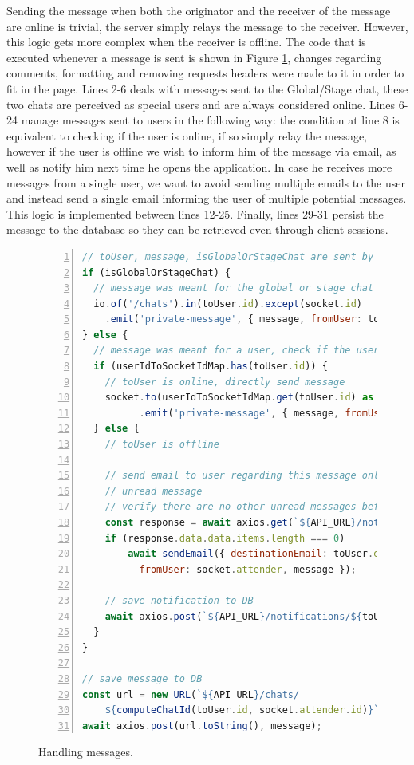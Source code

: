 Sending the message when both the originator and the receiver of the message are online is trivial, the server simply relays the message to the receiver. However, this logic gets more complex when the receiver is offline. The code that is executed whenever a message is sent is shown in Figure \ref{figure:backend-stage-server-messages}, changes regarding comments, formatting and removing requests headers were made to it in order to fit in the page. Lines 2-6 deals with messages sent to the Global/Stage chat, these two chats are perceived as special users and are always considered online. Lines 6-24 manage messages sent to users in the following way: the condition at line 8 is equivalent to checking if the user is online, if so simply relay the message, however if the user is offline we wish to inform him of the message via email, as well as notify him next time he opens the application. In case he receives more messages from a single user, we want to avoid sending multiple emails to the user and instead send a single email informing the user of multiple potential messages. This logic is implemented between lines 12-25. Finally, lines 29-31 persist the message to the database so they can be retrieved even through client sessions.

\begin{figure}[H]
\begin{lstlisting}[numbers=left,basicstyle=\small,language=JavaScript]
// toUser, message, isGlobalOrStageChat are sent by the client
if (isGlobalOrStageChat) {
  // message was meant for the global or stage chat
  io.of('/chats').in(toUser.id).except(socket.id)
    .emit('private-message', { message, fromUser: toUser });
} else {
  // message was meant for a user, check if the user is online
  if (userIdToSocketIdMap.has(toUser.id)) {
    // toUser is online, directly send message
    socket.to(userIdToSocketIdMap.get(toUser.id) as string)
          .emit('private-message', { message, fromUser: socket.attender });
  } else {
    // toUser is offline
    
    // send email to user regarding this message only if this is the first
    // unread message
    // verify there are no other unread messages before sending email
    const response = await axios.get(`${API_URL}/notifications/${toUser.id}`);
    if (response.data.data.items.length === 0)
        await sendEmail({ destinationEmail: toUser.email,
          fromUser: socket.attender, message });

    // save notification to DB
    await axios.post(`${API_URL}/notifications/${toUser.id}`, socket.attender);
  }
}

// save message to DB
const url = new URL(`${API_URL}/chats/
    ${computeChatId(toUser.id, socket.attender.id)}`);
await axios.post(url.toString(), message);
\end{lstlisting}
\caption{Handling messages.}
\label{figure:backend-stage-server-messages}
\end{figure}

